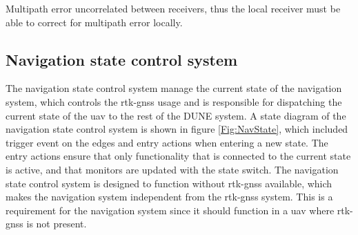 Multipath error uncorrelated between receivers, thus the local receiver must be able to correct for multipath error locally.

\subsection{Navigation state control system}\label{S:NavState}
The navigation state control system manage the current state of the navigation system, which controls the \gls{rtk-gnss} usage and is responsible for dispatching the current state of the \gls{uav} to the rest of the DUNE system. A state diagram of the navigation state control system is shown in figure \ref{Fig:NavState}, which included trigger event on the edges and entry actions when entering a new state. The entry actions ensure that only functionality that is connected to the current state is active, and that monitors are updated with the state switch. The navigation state control system is designed to function without \gls{rtk-gnss} available, which makes the navigation system independent from the \gls{rtk-gnss} system. This is a requirement for the navigation system since it should function in a \gls{uav} where \gls{rtk-gnss} is not present.

